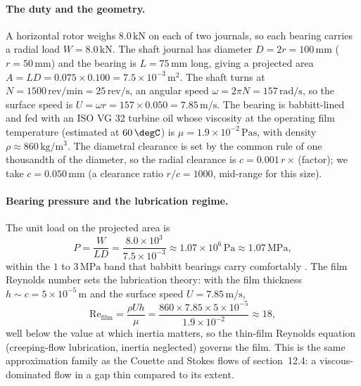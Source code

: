 \paragraph{The duty and the geometry.} A horizontal rotor weighs
$8.0\,\text{kN}$ on each of two journals, so each bearing carries a
radial load $W = 8.0\,\text{kN}$. The shaft journal has diameter
$D = 2r = 100\,\si{\milli\meter}$ ($r = 50\,\si{\milli\meter}$) and the
bearing is $L = 75\,\si{\milli\meter}$ long, giving a projected area
$A = L D = 0.075\times0.100 = 7.5\times10^{-3}\,\si{\meter\squared}$.
The shaft turns at $N = 1500\,\text{rev/min} = 25\,\text{rev/s}$, an
angular speed $\omega = 2\pi N = 157\,\si{\radian\per\second}$, so the
surface speed is $U = \omega r = 157\times0.050 = 7.85\,\si{\meter\per
\second}$. The bearing is babbitt-lined and fed with an ISO VG 32
turbine oil whose viscosity at the operating film temperature
(estimated at $60\,\degC$) is $\mu = 1.9\times10^{-2}\,\si{\pascal
\second}$, with density $\rho \approx 860\,\si{\kilogram\per\meter
\cubed}$. The diametral clearance is set by the common rule of one
thousandth of the diameter, so the radial clearance is $c = 0.001\,r
\times\,$(factor); we take $c = 0.050\,\si{\milli\meter}$ (a
clearance ratio $r/c = 1000$, mid-range for this size).

\paragraph{Bearing pressure and the lubrication regime.} The unit
load on the projected area is
\[
P = \frac{W}{LD} = \frac{8.0\times10^{3}}{7.5\times10^{-3}} \approx
1.07\times10^{6}\,\si{\pascal} \approx 1.07\,\text{MPa},
\]
within the $1$ to $3\,\text{MPa}$ band that babbitt bearings carry
comfortably \cite{text:stachowiak-batchelor}. The film Reynolds number
sets the lubrication theory: with the film thickness $h \sim c =
5\times10^{-5}\,\si{\meter}$ and the surface speed $U = 7.85\,\si{
\meter\per\second}$,
\[
\text{Re}_{\text{film}} = \frac{\rho U h}{\mu} = \frac{860\times7.85
\times5\times10^{-5}}{1.9\times10^{-2}} \approx 18,
\]
well below the value at which inertia matters, so the thin-film
Reynolds equation (creeping-flow lubrication, inertia neglected)
governs the film. This is the same approximation family as the
Couette and Stokes flows of section~12.4: a viscous-dominated flow in
a gap thin compared to its extent.

